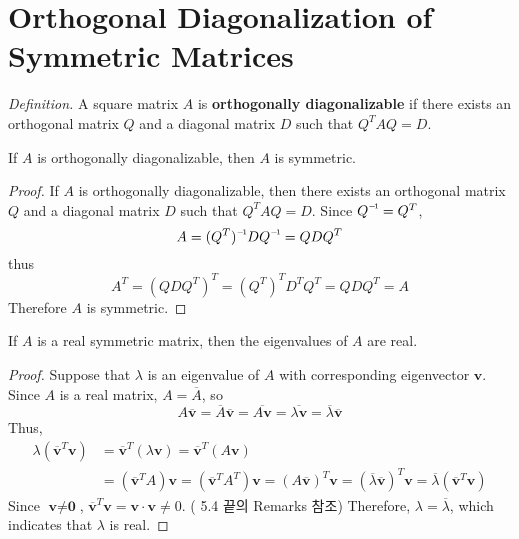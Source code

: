 \section{Orthogonal Diagonalization of Symmetric Matrices}

\textit{Definition.} A square matrix $A$ is \textbf{orthogonally diagonalizable} if there exists an orthogonal matrix $Q$ and a diagonal matrix $D$ such that $Q^TAQ = D$.

\begin{theorem}
	If $A$ is orthogonally diagonalizable, then $A$ is symmetric.
\end{theorem}
\begin{proof}
	If $A$ is orthogonally diagonalizable, then there exists an orthogonal matrix $Q$ and a diagonal matrix $D$ such that $Q^TAQ = D$. Since $\inv{Q} = Q^T$, \begin{equation*}
		A = \inv{(Q^T)}D\inv{Q} = QDQ^T
	\end{equation*} thus \begin{equation*}
		A^T = (QDQ^T)^T = (Q^T)^TD^TQ^T = QDQ^T = A
	\end{equation*}
	Therefore $A$ is symmetric.
\end{proof}

\begin{theorem}
	If $A$ is a real symmetric matrix, then the eigenvalues of $A$ are real.
\end{theorem}
\begin{proof}
	Suppose that $\lambda$ is an eigenvalue of $A$ with corresponding eigenvector $\textbf{v}$. Since $A$ is a real matrix, $A = \overline{A}$, so \begin{equation*}
		A\overline{\textbf{v}} = \overline{A}\overline{\textbf{v}} = \overline{A\textbf{v}} = \overline{\lambda\textbf{v}} = \overline{\lambda}\overline{\textbf{v}}
	\end{equation*}
	Thus, \begin{align*}
		\lambda(\overline{\textbf{v}}^T\textbf{v}) &= \overline{\textbf{v}}^T(\lambda\textbf{v}) = \overline{\textbf{v}}^T(A\textbf{v}) \\
		&= (\overline{\textbf{v}}^TA)\textbf{v} = (\overline{\textbf{v}}^TA^T)\textbf{v} = (A\overline{\textbf{v}})^T\textbf{v} = (\overline{\lambda}\overline{\textbf{v}})^T\textbf{v} = \overline{\lambda}(\overline{\textbf{v}}^T\textbf{v})
	\end{align*}
	Since $\textbf{v} \neq \textbf{0}$, $\overline{\textbf{v}}^T\textbf{v} = \textbf{v} \cdot \textbf{v} \neq 0$. ({\color{blue} 5.4 끝의 Remarks 참조}) Therefore, $\lambda = \overline{\lambda}$, which indicates that $\lambda$ is real.
\end{proof}

